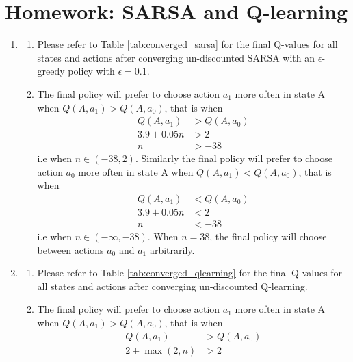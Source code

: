 \documentclass{article}
\begin{document}
\section*{Homework: SARSA and Q-learning}
\begin{enumerate}
	\item \begin{enumerate}
		      \item Please refer to Table \ref{tab:converged_sarsa} for the final Q-values for all
		            states and actions after converging un-discounted SARSA with an $\epsilon$-greedy
		            policy with $\epsilon=0.1$.
		      \item The final policy will prefer to choose action $a_1$ more often in state A when $Q(A,
			            a_1) > Q(A, a_0)$, that is when
		            \begin{align*}
			            Q(A,a_1)    & > Q(A, a_0) \\
			            3.9 + 0.05n & > 2         \\
			            n           & > -38
		            \end{align*}
		            i.e when $n \in (-38, 2)$. Similarly the final policy will prefer to choose action
		            $a_0$ more often in state A when $Q(A,
			            a_1) < Q(A, a_0)$, that is when
		            \begin{align*}
			            Q(A,a_1)    & < Q(A, a_0) \\
			            3.9 + 0.05n & < 2         \\
			            n           & < -38
		            \end{align*}
		            i.e when $n \in (-\infty, -38)$. When $n = 38$, the final policy will choose between
		            actions $a_0$ and $a_1$ arbitrarily.
	      \end{enumerate}
	\item \begin{enumerate}
		      \item Please refer to Table \ref{tab:converged_qlearning} for the final Q-values for all
		            states and actions after converging un-discounted Q-learning.
		      \item The final policy will prefer to choose action $a_1$ more often in state A when $Q(A,
			            a_1) > Q(A, a_0)$, that is when
		            \begin{align*}
			            Q(A,a_1)       & > Q(A, a_0) \\
			            2 + \max(2, n) & > 2         \\

\end{align*}
\end{enumerate}
\end{enumerate}
\end{document}

